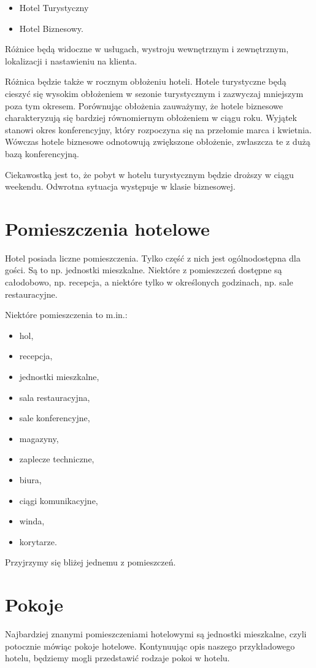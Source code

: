 \documentclass[a4paper,onecolumn,oneside,11pt,wide,floatssmall]{mwrep}
\theoremstyle{definition}
\theoremstyle{plain}%
\theoremstyle{remark}
\begin{document}
\begin{itemize}
  \item Hotel Turystyczny
  \item Hotel Biznesowy.
\end{itemize}

Różnice będą widoczne w usługach, wystroju wewnętrznym i zewnętrznym, 
lokalizacji i nastawieniu na klienta.

Różnica będzie także w rocznym obłożeniu hoteli. Hotele turystyczne będą 
cieszyć się wysokim obłożeniem w sezonie turystycznym i zazwyczaj 
mniejszym poza tym okresem. Porównując obłożenia zauważymy, że hotele biznesowe 
charakteryzują się bardziej równomiernym obłożeniem w ciągu roku. 
Wyjątek stanowi okres konferencyjny, który rozpoczyna się na przełomie 
marca i kwietnia. Wówczas hotele biznesowe odnotowują zwiększone obłożenie,
 zwłaszcza te z dużą bazą konferencyjną.

Ciekawostką jest to, że pobyt w hotelu turystycznym będzie droższy w ciągu 
weekendu. Odwrotna sytuacja występuje w klasie biznesowej.

\section{Pomieszczenia hotelowe}
Hotel posiada liczne pomieszczenia. Tylko część z nich jest ogólnodostępna 
dla gości. Są to np. jednostki mieszkalne. Niektóre z pomieszczeń dostępne są całodobowo, np. recepcja, a niektóre tylko w określonych godzinach, np. sale restauracyjne.

Niektóre pomieszczenia to m.in.:
\begin{itemize}
\item hol,
\item recepcja,
\item jednostki mieszkalne,
\item sala restauracyjna,
\item sale konferencyjne,
\item magazyny,
\item zaplecze techniczne,
\item biura,
\item ciągi komunikacyjne,
\item winda,
\item korytarze.
\end{itemize}

Przyjrzymy się bliżej jednemu z pomieszczeń.

\section{Pokoje}
Najbardziej znanymi pomieszczeniami hotelowymi są jednostki mieszkalne, czyli 
potocznie mówiąc pokoje hotelowe. Kontynuując opis naszego przykładowego 
hotelu, będziemy mogli przedstawić rodzaje pokoi w hotelu.
\end{document}
